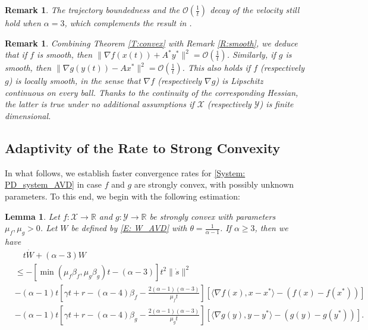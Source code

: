 \documentclass[pdflatex,sn-mathphys-num]{sn-jnl}
\theoremstyle{thmstyleone}
\newtheorem{lemma}[theorem]{Lemma}
\theoremstyle{thmstyletwo}
\newtheorem{remark}[theorem]{Remark}
\theoremstyle{thmstylethree}
\newcommand{\R}{\mathbb{R}}
\newcommand{\X}{\mathcal{X}}
\newcommand{\Y}{\mathcal{Y}}
\begin{document}
\begin{remark}
The trajectory boundedness and the $\mathcal{O}\left(\frac{1}{t}\right)$ decay of the velocity still hold when $\alpha=3$, which complements the result in \cite{Zeng_2020}.
\end{remark}

\begin{remark} \label{R:convergent_gradient}
    Combining Theorem \ref{T:convex} with Remark \ref{R:smooth}, we deduce that if $f$ is smooth, then $\|\nabla f(x(t))+A^*y^*\|^2=\mathcal{O}\left( \frac{1}{t} \right)$. Similarly, if $g$ is smooth, then $\|\nabla g(y(t))-Ax^*\|^2=\mathcal{O}\left( \frac{1}{t} \right)$. This also holds if $f$ (respectively $g$) is {\it locally} smooth, in the sense that $\nabla f$ (respectively $\nabla g$) is Lipschitz continuous on every ball. Thanks to the continuity of the corresponding Hessian, the latter is true under no additional assumptions if $\mathcal X$ (respectively $\mathcal Y$) is finite dimensional.
\end{remark}


\subsection{Adaptivity of the Rate to Strong Convexity}

In what follows, we establish faster convergence rates for \eqref{System: PD_system_AVD} in case $f$ and $g$ are strongly convex, with possibly unknown parameters. To this end, we begin with the following estimation:


\begin{lemma}\label{Lem: W_bound_AVD_SC}
Let $f:\X\to\R$ and $g:\Y\to\R$ be strongly convex with parameters $\mu_f,\mu_g>0$. Let $W$ be defined by \eqref{E: W_AVD} with $\theta = \frac{1}{\alpha-1}$. If $\alpha\ge 3$, then we have
\begin{align*}
&\quad t\dot{W} + (\alpha-3)W \\
&\le -\left[ \min(\mu_f\beta_f,\mu_g\beta_g) t - (\alpha-3) \right] t^2 \| \dot{s} \|^2\\
& -(\alpha-1)t \left[ \gamma t + r-(\alpha-4)\beta_f - \tfrac{2(\alpha-1)(\alpha-3)}{\mu_f t} \right] \left[\langle \nabla f(x), x-x^* \rangle - \left( f(x) - f(x^*) \right) \right] \\
& -(\alpha-1)t \left[ \gamma t + r-(\alpha-4)\beta_g - \tfrac{2(\alpha-1)(\alpha-3)}{\mu_g t} \right] \left[ \langle \nabla g(y), y-y^* \rangle - \left( g(y) - g(y^*) \right) \right]. 
\end{align*}
\end{lemma}
\end{document}
